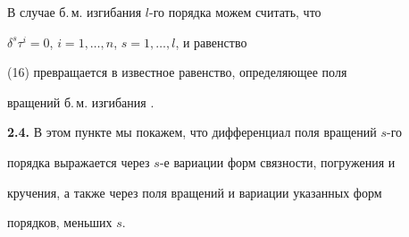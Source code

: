 В случае б.\,м. изгибания $l$-го порядка можем считать, что


$\delta^s\tau^i= 0$, $i= 1,\dotsc,n$, $s= 1,\dotsc,l$, и равенство


(16) превращается в известное равенство, определяющее поля


вращений б.\,м. изгибания \cite{Mark2}.


\medskip





{\bf 2.4.} В этом пункте мы покажем, что дифференциал поля вращений $s$-го


порядка выражается через $s$-е вариации форм связности, погружения и


кручения, а также через поля вращений и вариации указанных форм


порядков, меньших $s$.





